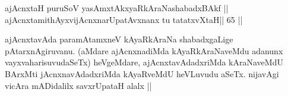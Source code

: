 

\begin{shl}
ajAcnxtaH puruSoV yasAmxtAkxyaRkAraNashabadxBAkf ||
ajAcnxtamithAyxvijAcnxnarUpatAvxnanx tu tatatxvXtaH\hfill || 65 ||
\end{shl}

\begin{artha}
ajAcnxtavAda paramAtamxneV kAyaRkAraNa shabadxgaLige
pAtarxnAgiruvanu. (aMdare ajAcnxnadiMda kAyaRkAraNaveMdu adanunx
vayxvaharisuvudaSeTx) heVgeMdare, ajAcnxtavAdadxriMda kAraNaveMdU BArxMti
jAcnxnavAdadxriMda kAyaRveMdU heVLuvudu aSeTx. nijavAgi vicAra
mADidalilx savxrUpataH alalx || 
\end{artha}
